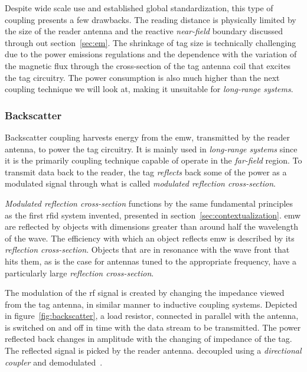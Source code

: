 Despite wide scale use and established global standardization, this type of coupling presents a few drawbacks. The reading distance is physically limited by the size of the reader antenna and the reactive \emph{near-field} boundary discussed through out section~\ref{sec:em}. The shrinkage of tag size is technically challenging due to the power emissions regulations and the dependence with the variation of the magnetic flux through the cross-section of the tag antenna coil that excites the tag circuitry. The power consumption is also much higher than the next coupling technique we will look at, making it unsuitable for \emph{long-range systems}.

\subsubsection{Backscatter}

Backscatter coupling harvests energy from the \ac{emw}, transmitted by the reader antenna, to power the tag circuitry. It is mainly used in \emph{long-range systems} since it is the primarily coupling technique capable of operate in the \emph{far-field} region.
To transmit data back to the reader, the tag \textit{reflects} back some of the power as a modulated signal through what is called \emph{modulated reflection cross-section}.

\emph{Modulated reflection cross-section} functions by the same fundamental principles as the first \ac{rfid} system invented, presented in section~\ref{sec:contextualization}.
\ac{emw} are reflected by objects with dimensions greater than around half the wavelength of the wave.
The efficiency with which an object reflects \ac{emw} is described by its \emph{reflection cross-section}. Objects that are in resonance with the wave front that hits them, as is the case for antennas tuned to the appropriate frequency, have a particularly large \emph{reflection cross-section}.

The modulation of the \ac{rf} signal is created by changing the impedance viewed from the tag antenna, in similar manner to inductive coupling systems. 
Depicted in figure~\ref{fig:backscatter}, a load resistor, connected in parallel with the antenna, is switched on and off in time with the data stream to be transmitted.
The power reflected back changes in amplitude with the changing of impedance of the tag.
The reflected signal is picked by the reader antenna. decoupled using a \emph{directional coupler} and demodulated~\cite{finkenzellerRFIDHandbookFundamentals2003, RFIDCouplingTechniques}.

